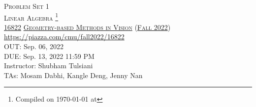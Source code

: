 \documentclass[11pt,addpoints,answers]{exam}
\title{\textsc{\hwName}} %
\author{}
\date{}
\date{}
\numberwithin{equation}{section} %
\numberwithin{figure}{section} %
\numberwithin{table}{section} %
\newcommand{\courseNum}{\href{https://geometric3d.github.io}{16822}}
\newcommand{\courseName}{\href{https://geometric3d.github.io}{Geometry-based Methods in Vision}}
\newcommand{\courseSem}{\href{https://geometric3d.github.io}{Fall 2022}}
\newcommand{\courseUrl}{\url{https://piazza.com/cmu/fall2022/16822}}
\newcommand{\hwNum}{Problem Set 1}
\newcommand{\hwTopic}{Linear Algebra }
\newcommand{\outDate}{Sep. 06, 2022}
\newcommand{\dueDate}{Sep. 13, 2022 11:59 PM}
\newcommand{\instructorName}{Shubham Tulsiani}
\newcommand{\taNames}{Mosam Dabhi, Kangle Deng, Jenny Nan}
\begin{document}
\section*{}
\begin{center}
  \textsc{\LARGE \hwNum} \\
  \textsc{\LARGE \hwTopic\footnote{Compiled on \today{} at \currenttime{}}} \\
  \vspace{1em}
  \textsc{\large \courseNum{} \courseName{} (\courseSem)} \\
  \courseUrl\\
  \vspace{1em}
  OUT: \outDate \\
  DUE: \dueDate \\
  Instructor: \instructorName \\
  TAs: \taNames
\end{center}
\end{document}
